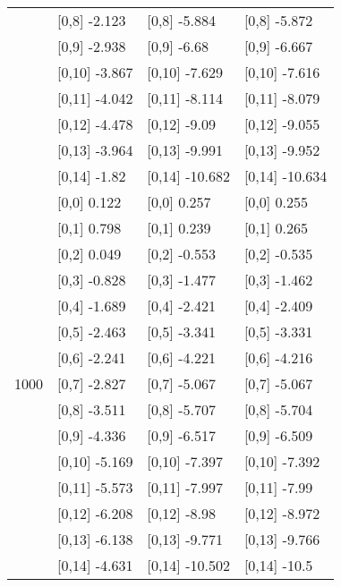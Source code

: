 \begin{table}
\begin{tabular}[t]{llll}
 & {}[0,8] -2.123 & {}[0,8] -5.884 & {}[0,8] -5.872\\
 & {}[0,9] -2.938 & {}[0,9] -6.68 & {}[0,9] -6.667\\
\addlinespace
 & {}[0,10] -3.867 & {}[0,10] -7.629 & {}[0,10] -7.616\\
 & {}[0,11] -4.042 & {}[0,11] -8.114 & {}[0,11] -8.079\\
 & {}[0,12] -4.478 & {}[0,12] -9.09 & {}[0,12] -9.055\\
 & {}[0,13] -3.964 & {}[0,13] -9.991 & {}[0,13] -9.952\\
 & {}[0,14] -1.82 & {}[0,14] -10.682 & {}[0,14] -10.634\\
\addlinespace
 & {}[0,0] 0.122 & {}[0,0] 0.257 & {}[0,0] 0.255\\
 & {}[0,1] 0.798 & {}[0,1] 0.239 & {}[0,1] 0.265\\
 & {}[0,2] 0.049 & {}[0,2] -0.553 & {}[0,2] -0.535\\
 & {}[0,3] -0.828 & {}[0,3] -1.477 & {}[0,3] -1.462\\
 & {}[0,4] -1.689 & {}[0,4] -2.421 & {}[0,4] -2.409\\
\addlinespace
 & {}[0,5] -2.463 & {}[0,5] -3.341 & {}[0,5] -3.331\\
 & {}[0,6] -2.241 & {}[0,6] -4.221 & {}[0,6] -4.216\\
1000 & {}[0,7] -2.827 & {}[0,7] -5.067 & {}[0,7] -5.067\\
 & {}[0,8] -3.511 & {}[0,8] -5.707 & {}[0,8] -5.704\\
 & {}[0,9] -4.336 & {}[0,9] -6.517 & {}[0,9] -6.509\\
\addlinespace
 & {}[0,10] -5.169 & {}[0,10] -7.397 & {}[0,10] -7.392\\
 & {}[0,11] -5.573 & {}[0,11] -7.997 & {}[0,11] -7.99\\
 & {}[0,12] -6.208 & {}[0,12] -8.98 & {}[0,12] -8.972\\
 & {}[0,13] -6.138 & {}[0,13] -9.771 & {}[0,13] -9.766\\
 & {}[0,14] -4.631 & {}[0,14] -10.502 & {}[0,14] -10.5\\
\bottomrule
\end{tabular}
\end{table}
